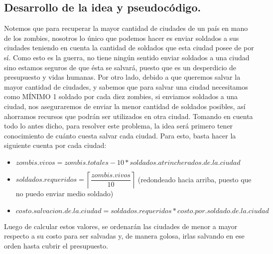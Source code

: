\vspace*{0.6cm}
\subsection{Desarrollo de la idea y pseudocódigo.}

\vspace*{0.3cm}

Notemos que para recuperar la mayor cantidad de ciudades de un país en mano de los zombies, nosotros lo único que podemos hacer es enviar soldados a sus ciudades teniendo en cuenta la cantidad de soldados que esta ciudad posee de por sí. Como esto es la guerra, no tiene ningún sentido enviar soldados a una ciudad sino estamos seguros de que ésta se salvará, puesto que es un desperdicio de presupuesto y vidas humanas. Por otro lado, debido a que queremos salvar la mayor cantidad de ciudades, y sabemos que para salvar una ciudad necesitamos como MÍNIMO 1 soldado por cada diez zombies, si enviamos soldados a una ciudad, nos aseguraremos de enviar la menor cantidad de soldados posibles, así ahorramos recursos que podrán ser utilizados en otra ciudad. Tomando en cuenta todo lo antes dicho, para resolver este problema, la idea será primero tener conocimiento de cuánto cuesta salvar cada ciudad. Para esto, basta hacer la siguiente cuenta por cada ciudad: %
\begin{itemize}
   \item $zombis.vivos = zombis.totales - 10 * soldados.atrincherados.de.la.ciudad$
   \item $soldados.requeridos = \left \lceil \dfrac{zombis.vivos}{10} \right \rceil$ (redondeado hacia arriba, puesto que no puedo enviar medio soldado)
   \item $costo.salvacion.de.la.ciudad = soldados.requeridos * costo.por.soldado.de.la.ciudad$
\end{itemize}

Luego de calcular estos valores, se ordenarán las ciudades de menor a mayor respecto a su costo para ser salvadas y, de manera golosa, irlas salvando en ese orden hasta cubrir el presupuesto.

